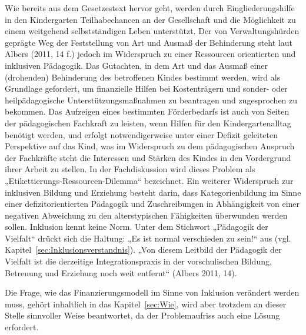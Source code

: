 Wie bereits aus dem Gesetzestext hervor geht, werden durch Eingliederungshilfe in den Kindergarten Teilhabechancen an der Gesellschaft und die Möglichkeit zu einem weitgehend selbstständigen Leben unterstützt. Der von Verwaltungshürden geprägte Weg der Feststellung von Art und Ausmaß der Behinderung steht laut Albers (2011, 14 f.) jedoch im Widerspruch zu einer Ressourcen orientierten und inklusiven Pädagogik. Das Gutachten, in dem Art und das Ausmaß einer (drohenden) Behinderung des betroffenen Kindes bestimmt werden, wird als Grundlage gefordert, um finanzielle Hilfen bei Kostenträgern und sonder- oder heilpädagogische Unterstützungsmaßnahmen zu beantragen und zugesprochen zu bekommen. Das Aufzeigen eines bestimmten Förderbedarfs ist auch von Seiten der pädagogischen Fachkraft zu leisten, wenn Hilfen für den Kindergartenalltag benötigt werden, und erfolgt notwendigerweise unter einer Defizit geleiteten Perspektive auf das Kind, was im Widerspruch zu dem pädagogischen Anspruch der Fachkräfte steht die Interessen und Stärken des Kindes in den Vordergrund ihrer Arbeit zu stellen. In der Fachdiskussion wird dieses Problem als „Etikettierungs-Ressourcen-Dilemma“ bezeichnet. 
Ein weiterer Widerspruch zur inklusiven Bildung und Erziehung besteht darin, dass Kategorienbildung im Sinne einer defizitorientierten Pädagogik und Zuschreibungen in Abhängigkeit von einer negativen Abweichung zu den alterstypischen Fähigkeiten überwunden werden sollen. Inklusion kennt keine Norm. Unter dem Stichwort „Pädagogik der Vielfalt“ drückt sich die Haltung: „Es ist normal verschieden zu sein!“ aus (vgl. Kapitel~\ref{sec:Inklusionsverstandnis}). „Von diesem Leitbild der Pädagogik der Vielfalt ist die derzeitige Integrationspraxis in der vorschulischen Bildung, Betreuung und Erziehung noch weit entfernt“ (Albers 2011, 14).

Die Frage, wie das Finanzierungsmodell im Sinne von Inklusion verändert werden muss, gehört inhaltlich in das Kapitel~\ref{sec:Wie}, wird aber trotzdem an dieser Stelle sinnvoller Weise beantwortet, da der Problemaufriss auch eine Lösung erfordert. 
 
